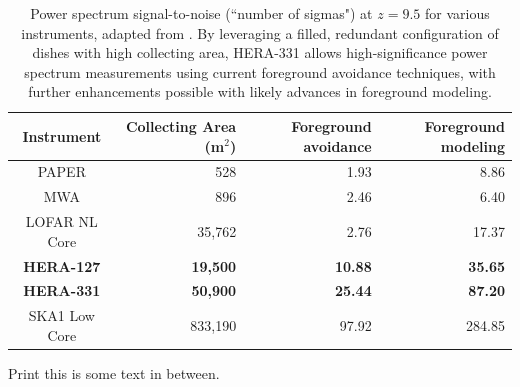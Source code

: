 \documentclass[ars]{/Users/daviddeboer1/Documents/Papers/Copernicus_LaTeX_Package_v_2_7/copernicus}
\begin{document}
\begin{table}[t]
\small
 \centering
 \begin{tabular}{c||r||r|r} 
\hline
Instrument & Collecting Area (m$^2$) & Foreground avoidance & Foreground modeling \\
\hline
PAPER & 528 & 1.93 & 8.86 \\
MWA & 896 & 2.46 & 6.40 \\
LOFAR NL Core & 35,762 & 2.76 & 17.37 \\
\textbf{HERA-127} & \textbf{19,500} & \textbf{10.88} & \textbf{35.65} \\
\textbf{HERA-331} & \textbf{50,900} & \textbf{25.44} & \textbf{87.20} \\
SKA1 Low Core & 833,190 & 97.92 & 284.85 \\
\end{tabular}
\caption{Power spectrum signal-to-noise (``number of sigmas") at $z=9.5$ for various instruments, adapted from \citet{pober_et_al2014}.  By leveraging a filled, redundant configuration of dishes with high collecting area, HERA-331 allows high-significance power spectrum measurements using current foreground avoidance techniques, with further enhancements possible with likely advances in foreground modeling.}
\label{tab:signif}
\end{table}

Print this is some text in between.
\end{document}
